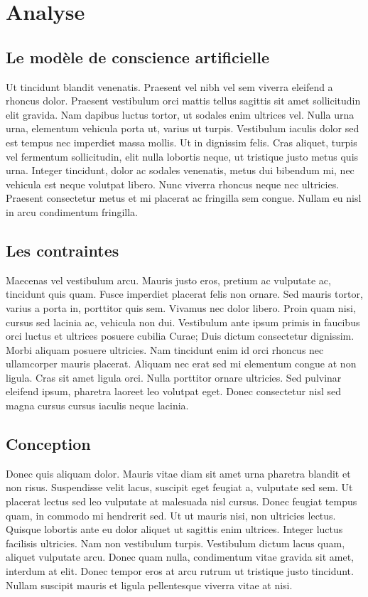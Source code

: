 \chapter{Analyse}
\minitoc

\section{Le modèle de conscience artificielle}

Ut tincidunt blandit venenatis. Praesent vel nibh vel sem viverra eleifend a rhoncus dolor. Praesent vestibulum orci mattis tellus sagittis sit amet sollicitudin elit gravida. Nam dapibus luctus tortor, ut sodales enim ultrices vel. Nulla urna urna, elementum vehicula porta ut, varius ut turpis. Vestibulum iaculis dolor sed est tempus nec imperdiet massa mollis. Ut in dignissim felis. Cras aliquet, turpis vel fermentum sollicitudin, elit nulla lobortis neque, ut tristique justo metus quis urna. Integer tincidunt, dolor ac sodales venenatis, metus dui bibendum mi, nec vehicula est neque volutpat libero. Nunc viverra rhoncus neque nec ultricies. Praesent consectetur metus et mi placerat ac fringilla sem congue. Nullam eu nisl in arcu condimentum fringilla. 

\section{Les contraintes}

Maecenas vel vestibulum arcu. Mauris justo eros, pretium ac vulputate ac, tincidunt quis quam. Fusce imperdiet placerat felis non ornare. Sed mauris tortor, varius a porta in, porttitor quis sem. Vivamus nec dolor libero. Proin quam nisi, cursus sed lacinia ac, vehicula non dui. Vestibulum ante ipsum primis in faucibus orci luctus et ultrices posuere cubilia Curae; Duis dictum consectetur dignissim. Morbi aliquam posuere ultricies. Nam tincidunt enim id orci rhoncus nec ullamcorper mauris placerat. Aliquam nec erat sed mi elementum congue at non ligula. Cras sit amet ligula orci. Nulla porttitor ornare ultricies. Sed pulvinar eleifend ipsum, pharetra laoreet leo volutpat eget. Donec consectetur nisl sed magna cursus cursus iaculis neque lacinia. 

\section{Conception}

Donec quis aliquam dolor. Mauris vitae diam sit amet urna pharetra blandit et non risus. Suspendisse velit lacus, suscipit eget feugiat a, vulputate sed sem. Ut placerat lectus sed leo vulputate at malesuada nisl cursus. Donec feugiat tempus quam, in commodo mi hendrerit sed. Ut ut mauris nisi, non ultricies lectus. Quisque lobortis ante eu dolor aliquet ut sagittis enim ultrices. Integer luctus facilisis ultricies. Nam non vestibulum turpis. Vestibulum dictum lacus quam, aliquet vulputate arcu. Donec quam nulla, condimentum vitae gravida sit amet, interdum at elit. Donec tempor eros at arcu rutrum ut tristique justo tincidunt. Nullam suscipit mauris et ligula pellentesque viverra vitae at nisi. 

